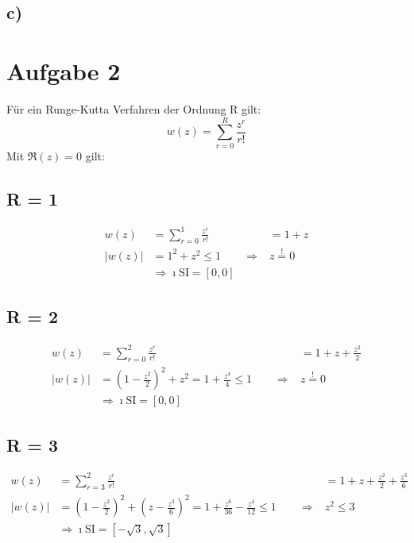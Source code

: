\documentclass[10pt,oneside,a4paper]{scrartcl}
\begin{document}
        \subsection*{c)}
    
    \section*{Aufgabe 2}
       Für ein Runge-Kutta Verfahren der Ordnung R gilt:
       \begin{equation*}
           w(z) = \sum\limits_{r=0}^R \frac{z^r}{r!}
       \end{equation*}
       Mit $\Re(z) = 0$ gilt:
       \subsection*{R = 1}
           \begin{align*}
               w(z) &= \sum\limits_{r=0}^1 \frac{z^r}{r!}
               &= 1 + z\\
               |w(z)| &= 1^2 + z^2 \leq 1 \qquad \Rightarrow  &z \stackrel{!}{=}
               0\\
               &\Rightarrow \imath\text{SI} = [0, 0]
           \end{align*}
      \subsection*{R = 2}
           \begin{align*}
               w(z) &= \sum\limits_{r=0}^2 \frac{z^r}{r!}
               &= 1 + z + \frac{z^2}{2}\\
              |w(z)| &= (1 - \frac{z^2}{2})^2 + z^2 = 1 + \frac{z^4}{4} \leq 1
              \qquad \Rightarrow  &z \stackrel{!}{=} 0\\
               &\Rightarrow \imath\text{SI} = [0, 0]
           \end{align*}
      \subsection*{R = 3}
           \begin{align*}
               w(z) &= \sum\limits_{r=3}^2 \frac{z^r}{r!}
               &= 1 + z + \frac{z^2}{2} + \frac{z^3}{6}\\
              |w(z)| &= (1 - \frac{z^2}{2})^2 + (z - \frac{z^3}{6})^2 = 1 +
              \frac{z^6}{36} - \frac{z^4}{12} \leq 1 \qquad \Rightarrow  &z^2
              \leq 3\\ &\Rightarrow \imath\text{SI} = [-\sqrt{3}, \sqrt{3}]
           \end{align*}
\end{document}
